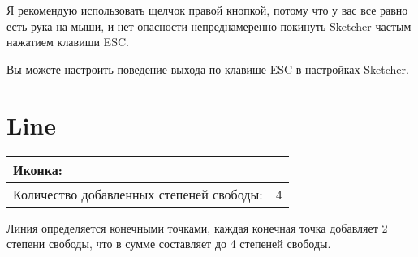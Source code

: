 \documentclass[12pt,titlepage]{article}
\newcommand{\icon}[1]{\raisebox{-1em}{\rule{0pt}{27pt}\texttt{[image: images/\#1]}}}
\newcommand{\dofAdded}{Количество добавленных степеней свободы:}
\begin{document}
Я рекомендую использовать щелчок правой кнопкой, потому что у вас все равно есть рука на мыши, и нет опасности непреднамеренно покинуть Sketcher частым нажатием клавиши ESC.

Вы можете настроить поведение выхода по клавише ESC в настройках Sketcher.

\section{Line}
\begin{tabular}{|l|l|}
\hline
Иконка: & \icon{Sketcher_CreateLine}\\
\hline
\dofAdded & 4\\
\hline
\end{tabular}

Линия определяется конечными точками, каждая конечная точка добавляет 2 степени свободы, что в сумме составляет до 4 степеней свободы.
\end{document}
